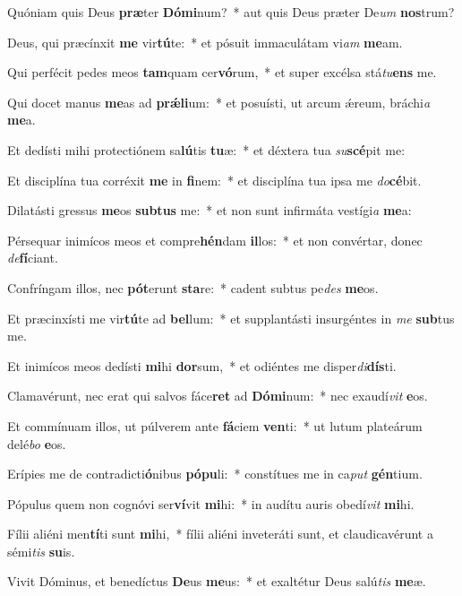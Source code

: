 \item Quóniam quis Deus \textbf{præ}ter \textbf{Dó}\textbf{mi}num?~* aut quis Deus præter De\textit{um} \textbf{nos}trum?
\item Deus, qui præcínxit \textbf{me} vir\textbf{tú}te:~* et pósuit immaculátam vi\textit{am} \textbf{me}am.
\item Qui perfécit pedes meos \textbf{tam}quam cer\textbf{vó}rum,~* et super excélsa stá\textit{tu}\textbf{ens} me.
\item Qui docet manus \textbf{me}as ad \textbf{prǽ}\textbf{li}um:~* et posuísti, ut arcum ǽreum, bráchi\textit{a} \textbf{me}a.
\item Et dedísti mihi protectiónem sa\textbf{lú}tis \textbf{tu}æ:~* et déxtera tua \textit{su}\textbf{scé}pit me:
\item Et disciplína tua corréxit \textbf{me} in \textbf{fi}nem:~* et disciplína tua ipsa me \textit{do}\textbf{cé}bit.
\item Dilatásti gressus \textbf{me}os \textbf{sub}\textbf{tus} me:~* et non sunt infirmáta vestígi\textit{a} \textbf{me}a:
\item Pérsequar inimícos meos et compre\textbf{hén}dam \textbf{il}los:~* et non convértar, donec \textit{de}\textbf{fí}ciant.
\item Confríngam illos, nec \textbf{pót}erunt \textbf{sta}re:~* cadent subtus pe\textit{des} \textbf{me}os.
\item Et præcinxísti me vir\textbf{tú}te ad \textbf{bel}lum:~* et supplantásti insurgéntes in \textit{me} \textbf{sub}tus me.
\item Et inimícos meos dedísti \textbf{mi}hi \textbf{dor}sum,~* et odiéntes me disper\textit{di}\textbf{dís}ti.
\item Clamavérunt, nec erat qui salvos fáce\textbf{ret} ad \textbf{Dó}\textbf{mi}num:~* nec exaudí\textit{vit} \textbf{e}os.
\item Et commínuam illos, ut púlverem ante \textbf{fá}ciem \textbf{ven}ti:~* ut lutum plateárum delé\textit{bo} \textbf{e}os.
\item Erípies me de contradicti\textbf{ó}nibus \textbf{pó}\textbf{pu}li:~* constítues me in ca\textit{put} \textbf{gén}tium.
\item Pópulus quem non cognóvi ser\textbf{ví}vit \textbf{mi}hi:~* in audítu auris obedí\textit{vit} \textbf{mi}hi.
\item Fílii aliéni men\textbf{tí}ti sunt \textbf{mi}hi,~* fílii aliéni inveteráti sunt, et claudicavérunt a sémi\textit{tis} \textbf{su}is.
\item Vivit Dóminus, et benedíctus \textbf{De}us \textbf{me}us:~* et exaltétur Deus salú\textit{tis} \textbf{me}æ.
